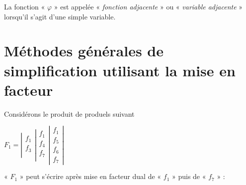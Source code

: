  \bigskip 

La fonction « $\varphi$ » est appelée « \textsl {fonction adjacente} » ou « \textsl {variable adjacente}  » lorsqu'il s'agit d'une simple variable.   

\newpage 

\section{Méthodes générales de simplification utilisant la mise en facteur} 

Considérons le produit de produels suivant 


\bigskip 

\centerline{ $
F_1 = \left|\begin{array}{c} 
            f_1 \\ f_3 \\
        \end{array}\right. 
        \left|\begin{array}{c} 
            f_1 \\ f_4 \\ f_7 \\
        \end{array}\right. 
         \left|\begin{array}{c} 
            f_1 \\ f_5 \\ f_6 \\ f_7 
        \end{array}\right| 
$ }

\bigskip 

« $F_1$ » peut s'écrire après mise en facteur dual de « $f_1$ » puis de « $f_7$ » :

\bigskip 

